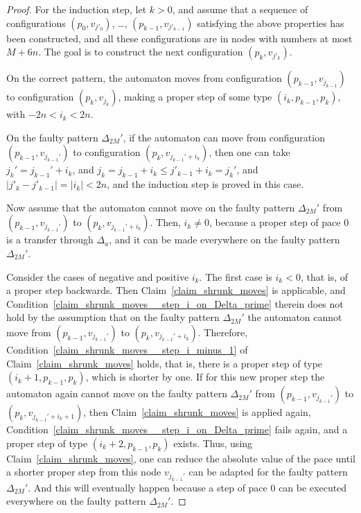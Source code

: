 \documentclass[12pt,a4paper]{article}
\theoremstyle{definition}
\begin{document}
\begin{proof}
For the induction step,
let $k > 0$, and assume that a sequence of configurations
$(p_0,v_{j'_0})$, \ldots, $(p_{k-1},v_{j'_{k-1}})$ satisfying the above properties
has been constructed,
and all these configurations are in nodes with numbers at most $M+6n$.
The goal is to construct the next configuration $(p_k,v_{j'_k})$.

On the correct pattern, the automaton moves
from configuration $(p_{k-1},v_{j_{k-1}})$ to configuration $(p_k,v_{j_k})$,
making a proper step of some type $(i_k,p_{k-1},p_k)$, with $-2n < i_k < 2n$.

On the faulty pattern $\Delta_{2M}'$,
if the automaton can move from configuration $(p_{k-1},v_{j_{k-1}'})$
to configuration $(p_k,v_{j_{k-1}'+i_k})$,
then one can take $j_k' = j_{k-1}'+i_k$,
and $j_k = j_{k-1}+i_k \leqslant j'_{k-1}+i_k = j_k'$,
and $|j'_k-j'_{k-1}| = |i_k| < 2n$,
and the induction step is proved in this case.

Now assume that the automaton cannot move on the faulty pattern $\Delta_{2M}'$ 
from $(p_{k-1},v_{j_{k-1}'})$ to $(p_k,v_{j_{k-1}'+i_k})$.
Then, $i_k \neq 0$,
because a proper step of pace $0$ is a transfer through $\Delta_a$,
and it can be made everywhere on the faulty pattern $\Delta_{2M}'$. 

Consider the cases of negative and positive $i_k$.
The first case is $i_k < 0$, that is, of a proper step backwards.
Then Claim~\ref{claim_shrunk_moves} is applicable,
and Condition~\ref{claim_shrunk_moves__step_i_on_Delta_prime} therein does not hold
by the assumption that on the faulty pattern $\Delta_{2M}'$
the automaton cannot move from $(p_{k-1},v_{j_{k-1}'})$ to $(p_k,v_{j_{k-1}'+i_k})$.
Therefore, Condition~\ref{claim_shrunk_moves__step_i_minus_1} of Claim~\ref{claim_shrunk_moves} holds,
that is, there is a proper step of type $(i_k+1,p_{k-1},p_k)$, which is shorter by one.
If for this new proper step the automaton again cannot move on the faulty pattern $\Delta_{2M}'$
from $(p_{k-1},v_{j_{k-1}'})$ to $(p_k,v_{j_{k-1}'+i_k+1})$,
then Claim~\ref{claim_shrunk_moves} is applied again,
Condition~\ref{claim_shrunk_moves__step_i_on_Delta_prime} fails again,
and a proper step of type $(i_k+2,p_{k-1},p_k)$ exists.
Thus, using Claim~\ref{claim_shrunk_moves},
one can reduce the absolute value of the pace
until a shorter proper step from this node $v_{j_{k-1}'}$
can be adapted for the faulty pattern $\Delta_{2M}'$.
And this will eventually happen
because a step of pace $0$ can be executed everywhere on the faulty pattern $\Delta_{2M}'$.


\end{proof}
\end{document}
